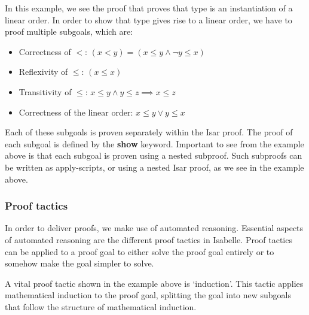 In this example, we see the proof that proves that type \isasymM{} is an instantiation of a linear order. In order to show that type \isasymM{} gives rise to a linear order, we have to proof multiple subgoals, which are:
\begin{itemize}
    \item Correctness of $<$: $(x < y) = (x \leq y \land \lnot y \leq x)$
    \item Reflexivity of $\leq$: $(x \leq x)$
    \item Transitivity of $\leq$: $x \leq y \land y \leq z \implies x \leq z$
    \item Correctness of the linear order: $x \leq y \lor y \leq x$
\end{itemize}
Each of these subgoals is proven separately within the Isar proof. The proof of each subgoal is defined by the \textbf{show} keyword. Important to see from the example above is that each subgoal is proven using a nested subproof. Such subproofs can be written as apply-scripts, or using a nested Isar proof, as we see in the example above.

\subsubsection{Proof tactics}
In order to deliver proofs, we make use of automated reasoning. Essential aspects of automated reasoning are the different proof tactics in Isabelle. Proof tactics can be applied to a proof goal to either solve the proof goal entirely or to somehow make the goal simpler to solve.

A vital proof tactic shown in the example above is `induction'. This tactic applies mathematical induction to the proof goal, splitting the goal into new subgoals that follow the structure of mathematical induction. 

